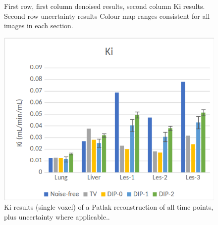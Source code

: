 \documentclass[portrait, color=UCLburgundy, margin=1cm]{uclposter}
\begin{document}
\begin{multicols}{2}
\begin{figure}[H]
                \begin{highlightbox}[UCLlightblue]
                    \captionsetup{singlelinecheck=false, justification=centering}
                    \caption{First row, first column denoised results, second column Ki results. Second row uncertainty results Colour map ranges consistent for all images in each section.}
                \end{highlightbox}
                
                \label{fig:visual_analysis}
            \end{figure}
            
            \begin{figure}[H]
                \centering
            
                \includegraphics[width=0.9\linewidth]{ki.png}    
                
                \begin{highlightbox}[UCLlightblue]
                    \captionsetup{singlelinecheck=false, justification=centering}
                    \caption{Ki results (single voxel) of a Patlak reconstruction of all time points, plus uncertainty where applicable..}
                \end{highlightbox}
                
                \label{fig:ki}
            \end{figure}
    \end{multicols}
\end{document}
